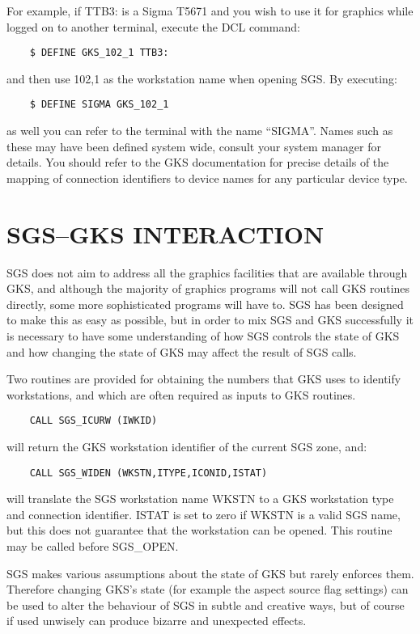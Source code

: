 For example, if TTB3: is a Sigma T5671 and you wish to use it for graphics
while logged on to another terminal, execute the DCL command:
\begin{verbatim}
    $ DEFINE GKS_102_1 TTB3:
\end{verbatim}
and then use 102,1 as the workstation name when opening SGS.  By executing:
\begin{verbatim}
    $ DEFINE SIGMA GKS_102_1
\end{verbatim}
as well you can refer to the terminal with the name ``SIGMA''.  Names such
as these may have been defined system wide, consult your system manager
for details. You should
refer to the GKS documentation for precise details of the mapping of connection
identifiers to device names for any particular device type.

\section {SGS--GKS INTERACTION}\label{app-interaction}

SGS does not aim to address all the graphics facilities that are available
through GKS, and although the majority of graphics programs will not call GKS
routines directly, some more sophisticated programs will have to.
SGS has been designed to make this as easy as possible, but in order to mix
SGS and GKS successfully it is necessary to have some understanding of how SGS
controls the state of GKS and how changing the state of GKS may affect the
result of SGS calls.

Two routines are provided for obtaining the numbers that GKS uses to identify
workstations, and which are often required as inputs to GKS routines.
\begin{verbatim}
    CALL SGS_ICURW (IWKID)
\end{verbatim}
will return the GKS workstation identifier of the current SGS zone, and:
\begin{verbatim}
    CALL SGS_WIDEN (WKSTN,ITYPE,ICONID,ISTAT)
\end{verbatim}
will translate the SGS workstation name WKSTN to a GKS workstation type and
connection identifier.
ISTAT is set to zero if WKSTN is a valid SGS name, but this does not guarantee
that the workstation can be opened.
This routine may be called before SGS\_OPEN.

SGS makes various assumptions about the state of GKS but rarely enforces them.
Therefore changing GKS's state (for example the aspect source flag settings)
can be used to alter the behaviour of SGS in subtle and creative ways, but of
course if used unwisely can produce bizarre and unexpected effects.

